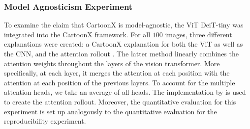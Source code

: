 
\subsubsection{Model Agnosticism Experiment}\label{exp2}
To examine the claim that CartoonX is model-agnostic, the ViT DeiT-tiny \cite{pmlr-v139-touvron21a} was integrated into the CartoonX framework. For all $100$ images, three different explanations were created: a CartoonX explanation for both the ViT as well as the CNN, and the attention rollout \cite{abnar2020quantifying}. The latter method linearly combines the attention weights throughout the layers of the vision transformer. More specifically, at each layer, it merges the attention at each position with the attention at each position of the previous layers. To account for the multiple attention heads, we take an average of all heads. The implementation by \cite{vitexplain_repo} is used to create the attention rollout.
Moreover, the quantitative evaluation for this experiment is set up analogously to the quantitative evaluation for the reproducibility experiment.

